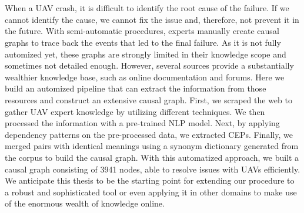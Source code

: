 \chapter{\abstractname}

When a \ac{UAV} crash, it is difficult to identify the root cause of the failure.
If we cannot identify the cause, we cannot fix the issue and, therefore, not prevent it in the future.
With semi-automatic procedures, experts manually create causal graphs to trace back the events that led to the final failure.
As it is not fully automized yet, these graphs are strongly limited in their knowledge scope and sometimes not detailed enough.
However, several sources provide a substantially wealthier knowledge base, such as online documentation and forums.
Here we build an automized pipeline that can extract the information from those resources and construct an extensive causal graph.
First, we scraped the web to gather \ac{UAV} expert knowledge by utilizing different techniques.
We then processed the information with a pre-trained \ac{NLP} model.
Next, by applying dependency patterns on the pre-processed data, we extracted \ac{CEP}s.
Finally, we merged pairs with identical meanings using a synonym dictionary generated from the corpus to build the causal graph.
With this automatized approach, we built a causal graph consisting of 3941 nodes, able to resolve issues with \ac{UAV}s efficiently.
We anticipate this thesis to be the starting point for extending our procedure to a robust and sophisticated tool or even applying it in other domains to make use of the enormous wealth of knowledge online.
